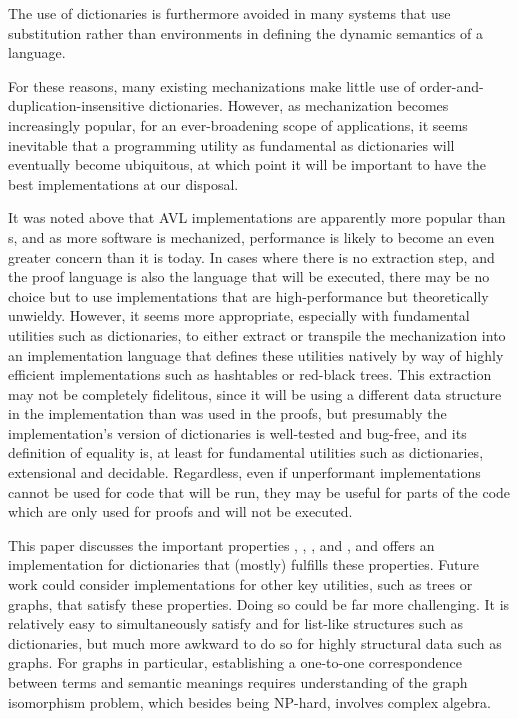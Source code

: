 The use of dictionaries is furthermore avoided in many systems that use substitution rather than environments
%
in defining the dynamic semantics of a language.

For these reasons, many existing mechanizations make little use of order-and-duplication-insensitive dictionaries. 
%
However, as mechanization becomes increasingly popular, for an ever-broadening scope of applications,
%
it seems inevitable that a programming utility as fundamental as dictionaries will eventually become ubiquitous, at which point it will be important to have the
%
best implementations at our disposal.

%
It was noted above that AVL implementations are apparently more popular than {\cal}s, and as more software is mechanized, performance is likely to become an
%
even greater concern than it is today. In cases where there is no extraction step, and the proof language is also the language that will be executed,
%
there may be no choice but to use implementations that are high-performance but theoretically unwieldy. However, it seems more appropriate, especially with
%
fundamental utilities such as dictionaries, to either extract or transpile the mechanization into an implementation language that defines these utilities natively
%
by way of highly efficient implementations such as hashtables or red-black trees. This extraction may not be completely fidelitous, since it will be using a
%
different data structure in the implementation than was used in the proofs, but presumably the implementation's version of dictionaries is well-tested and bug-free,
%
and its definition of equality is, at least for fundamental utilities such as dictionaries, extensional and decidable. Regardless, even if unperformant implementations
%
cannot be used for code that will be run, they may be useful for parts of the code which are only used for proofs and will not be executed.

%
This paper discusses the important properties \SemTot, \SemInj, \EqDec, and \EzDstr, and offers an implementation for dictionaries that (mostly) fulfills these properties.
%
Future work could consider implementations for other key utilities, such as trees or graphs, that satisfy these properties.
%
Doing so could be far more challenging.
%
It is relatively easy to simultaneously satisfy \SemTot{} and \SemInj{} for list-like structures such as dictionaries,
%
but much more awkward to do so for highly structural data such as graphs. For graphs in particular, establishing a one-to-one correspondence between terms and
%
semantic meanings requires understanding of the graph isomorphism problem, which besides being NP-hard, involves complex algebra.


